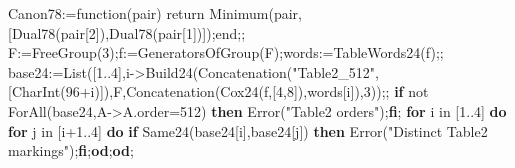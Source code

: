 \documentclass[
  10pt,
  letterpaper,
]{article}
\newenvironment{Shaded}{}{}
\newcommand{\BuiltInTok}[1]{\textcolor[rgb]{0.00,0.50,0.00}{#1}}
\newcommand{\ConstantTok}[1]{\textcolor[rgb]{0.53,0.00,0.00}{#1}}
\newcommand{\ControlFlowTok}[1]{\textcolor[rgb]{0.00,0.44,0.13}{\textbf{#1}}}
\newcommand{\ExtensionTok}[1]{#1}
\newcommand{\FloatTok}[1]{\textcolor[rgb]{0.25,0.63,0.44}{#1}}
\newcommand{\FunctionTok}[1]{\textcolor[rgb]{0.02,0.16,0.49}{#1}}
\newcommand{\NormalTok}[1]{#1}
\newcommand{\OperatorTok}[1]{\textcolor[rgb]{0.40,0.40,0.40}{#1}}
\newcommand{\StringTok}[1]{\textcolor[rgb]{0.25,0.44,0.63}{#1}}
\newcommand{\VariableTok}[1]{\textcolor[rgb]{0.10,0.09,0.49}{#1}}
\begin{document}
\begin{Shaded}
\begin{Highlighting}[]
\VariableTok{Canon78}\OperatorTok{:=}\FunctionTok{function}\NormalTok{(}\VariableTok{pair}\NormalTok{) }\ExtensionTok{return} \BuiltInTok{Minimum}\NormalTok{(}\VariableTok{pair}\OperatorTok{,}\NormalTok{[}\VariableTok{Dual78}\NormalTok{(}\VariableTok{pair}\NormalTok{[}\FloatTok{2}\NormalTok{])}\OperatorTok{,}\VariableTok{Dual78}\NormalTok{(}\VariableTok{pair}\NormalTok{[}\FloatTok{1}\NormalTok{])])}\OperatorTok{;}\FunctionTok{end}\OperatorTok{;;}
\VariableTok{F}\OperatorTok{:=}\BuiltInTok{FreeGroup}\NormalTok{(}\FloatTok{3}\NormalTok{)}\OperatorTok{;}\VariableTok{f}\OperatorTok{:=}\BuiltInTok{GeneratorsOfGroup}\NormalTok{(}\VariableTok{F}\NormalTok{)}\OperatorTok{;}\VariableTok{words}\OperatorTok{:=}\VariableTok{TableWords24}\NormalTok{(}\VariableTok{f}\NormalTok{)}\OperatorTok{;;}
\VariableTok{base24}\OperatorTok{:=}\BuiltInTok{List}\NormalTok{([}\FloatTok{1}\OperatorTok{..}\FloatTok{4}\NormalTok{]}\OperatorTok{,}\VariableTok{i}\OperatorTok{{-}\textgreater{}}\VariableTok{Build24}\NormalTok{(}\BuiltInTok{Concatenation}\NormalTok{(}\StringTok{"Table2\_512"}\OperatorTok{,}\NormalTok{[}\VariableTok{CharInt}\NormalTok{(}\FloatTok{96}\OperatorTok{+}\VariableTok{i}\NormalTok{)])}\OperatorTok{,}\VariableTok{F}\OperatorTok{,}\BuiltInTok{Concatenation}\NormalTok{(}\VariableTok{Cox24}\NormalTok{(}\VariableTok{f}\OperatorTok{,}\NormalTok{[}\FloatTok{4}\OperatorTok{,}\FloatTok{8}\NormalTok{])}\OperatorTok{,}\VariableTok{words}\NormalTok{[}\VariableTok{i}\NormalTok{])}\OperatorTok{,}\FloatTok{3}\NormalTok{))}\OperatorTok{;;}
\ControlFlowTok{if} \ConstantTok{not} \BuiltInTok{ForAll}\NormalTok{(}\VariableTok{base24}\OperatorTok{,}\VariableTok{A}\OperatorTok{{-}\textgreater{}}\VariableTok{A}\NormalTok{.}\VariableTok{order}\OperatorTok{=}\FloatTok{512}\NormalTok{) }\ControlFlowTok{then} \BuiltInTok{Error}\NormalTok{(}\StringTok{"Table2 orders"}\NormalTok{)}\OperatorTok{;}\ControlFlowTok{fi}\OperatorTok{;}
\ControlFlowTok{for} \VariableTok{i} \ExtensionTok{in}\NormalTok{ [}\FloatTok{1}\OperatorTok{..}\FloatTok{4}\NormalTok{] }\ControlFlowTok{do} \ControlFlowTok{for} \VariableTok{j} \ExtensionTok{in}\NormalTok{ [}\VariableTok{i}\OperatorTok{+}\FloatTok{1}\OperatorTok{..}\FloatTok{4}\NormalTok{] }\ControlFlowTok{do} \ControlFlowTok{if} \VariableTok{Same24}\NormalTok{(}\VariableTok{base24}\NormalTok{[}\VariableTok{i}\NormalTok{]}\OperatorTok{,}\VariableTok{base24}\NormalTok{[}\VariableTok{j}\NormalTok{]) }\ControlFlowTok{then} \BuiltInTok{Error}\NormalTok{(}\StringTok{"Distinct Table2 markings"}\NormalTok{)}\OperatorTok{;}\ControlFlowTok{fi}\OperatorTok{;}\ControlFlowTok{od}\OperatorTok{;}\ControlFlowTok{od}\OperatorTok{;}

\end{Highlighting}
\end{Shaded}
\end{document}
